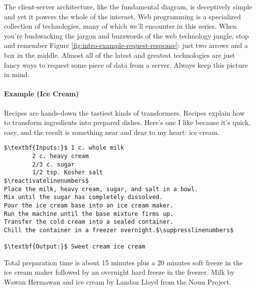 The client-server architecture, like the fundamental diagram, is deceptively simple and yet it powers the whole of the internet. Web programming is a specialized collection of technologies, many of which we'll encounter in this series. When you're bushwacking the jargon and buzzwords of the web technology jungle, stop and remember Figure \ref{fig:intro-example-request-response}: just two arrows and a box in the middle. Almost all of the latest and greatest technologies are just fancy ways to request some piece of data from a server. Always keep this picture in mind.

\paragraph{Example (Ice Cream)} Recipes are hands-down the tastiest kinds of transformers. Recipes explain how to transform ingredients into prepared dishes. Here's one I like because it's quick, easy, and the result is something near and dear to my heart: ice cream.

\suppresslinenumbers
\begin{lstlisting}[caption={Ice cream transformer},escapeinside=$$]
$\textbf{Inputs:}$ 1 c. whole milk
        2 c. heavy cream
        2/3 c. sugar
        1/2 tsp. Kosher salt
$\reactivatelinenumbers$
Place the milk, heavy cream, sugar, and salt in a bowl.
Mix until the sugar has completely dissolved.
Pour the ice cream base into an ice cream maker.
Run the machine until the base mixture firms up.
Transfer the cold cream into a sealed container.
Chill the container in a freezer overnight.$\suppresslinenumbers$

$\textbf{Output:}$ Sweet cream ice cream
\end{lstlisting}

\begin{marginfigure}
  
  \caption{\label{fig:intro-example-ice-cream} Total preparation time is about 15 minutes plus a 20 minutes soft freeze in the ice cream maker followed by an overnight hard freeze in the freezer.\vskip 5pt Milk by Wawan Hermawan and ice cream by Landan Lloyd from the Noun Project.}
\end{marginfigure}


